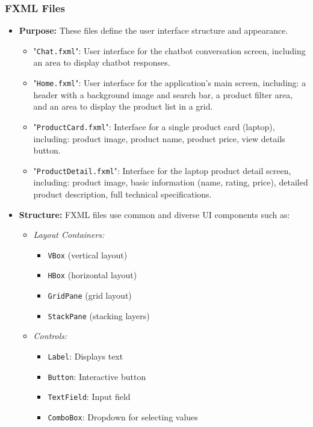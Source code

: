 \documentclass{article}
\begin{document}
\subsubsection{FXML Files}
\begin{itemize}
    \item \textbf{Purpose:} These files define the user interface structure and appearance.
    \begin{itemize}
        \item "\texttt{Chat.fxml}": User interface for the chatbot conversation screen, including an area to display chatbot responses.
        \item "\texttt{Home.fxml}": User interface for the application's main screen, including: a header with a background image and search bar, a product filter area, and an area to display the product list in a grid.
        \item "\texttt{ProductCard.fxml}": Interface for a single product card (laptop), including: product image, product name, product price, view details button.
        \item "\texttt{ProductDetail.fxml}": Interface for the laptop product detail screen, including: product image, basic information (name, rating, price), detailed product description, full technical specifications.
    \end{itemize}
    \item \textbf{Structure:} FXML files use common and diverse UI components such as:
    \begin{itemize}
        \item \textit{Layout Containers:}
        \begin{itemize}
            \item \texttt{VBox} (vertical layout)
            \item \texttt{HBox} (horizontal layout)
            \item \texttt{GridPane} (grid layout)
            \item \texttt{StackPane} (stacking layers)
        \end{itemize}
        \item \textit{Controls:}
        \begin{itemize}
            \item \texttt{Label}: Displays text
            \item \texttt{Button}: Interactive button
            \item \texttt{TextField}: Input field
            \item \texttt{ComboBox}: Dropdown for selecting values

\end{itemize}
\end{itemize}
\end{itemize}
\end{document}
